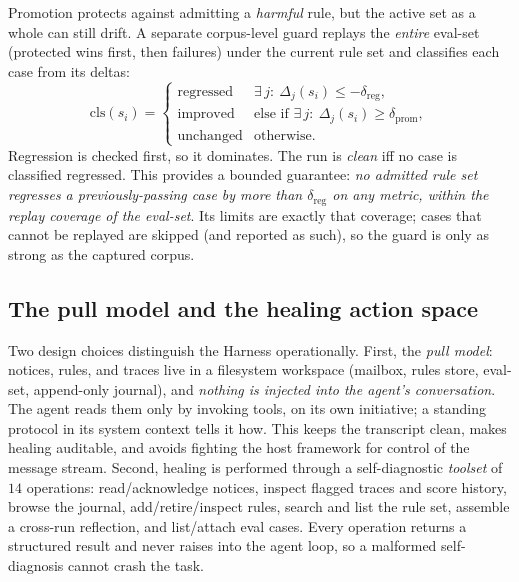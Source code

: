 \documentclass[letterpaper]{article} %
\newcommand{\dpromote}{\delta_{\mathrm{prom}}}
\newcommand{\dregress}{\delta_{\mathrm{reg}}}
\begin{document}
Promotion protects against admitting a \emph{harmful} rule, but the active set as a whole can
still drift. A separate corpus-level guard replays the \emph{entire} eval-set (protected wins
first, then failures) under the current rule set and classifies each case from its deltas:
\begin{equation}
  \mathrm{cls}(s_i) =
  \begin{cases}
    \text{regressed} & \exists\, j:\ \Delta_j(s_i) \le -\dregress,\\[2pt]
    \text{improved}  & \text{else if } \exists\, j:\ \Delta_j(s_i) \ge \dpromote,\\[2pt]
    \text{unchanged} & \text{otherwise.}
  \end{cases}
  \label{eq:regcls}
\end{equation}
Regression is checked first, so it dominates. The run is \emph{clean} iff no case is classified
regressed. This provides a bounded guarantee: \emph{no admitted rule set regresses a
previously-passing case by more than $\dregress$ on any metric, within the replay coverage of
the eval-set}. Its limits are exactly that coverage; cases that cannot be replayed are
skipped (and reported as such), so the guard is only as strong as the captured corpus.

\subsection{The pull model and the healing action space}
\label{sec:actionspace}

Two design choices distinguish the Harness operationally. First, the \emph{pull model}:
notices, rules, and traces live in a filesystem workspace (mailbox, rules store, eval-set,
append-only journal), and \emph{nothing is injected into the agent's conversation}. The agent
reads them only by invoking tools, on its own initiative; a standing protocol in its system
context tells it how. This keeps the transcript clean, makes healing auditable, and avoids
fighting the host framework for control of the message stream. Second, healing is performed
through a self-diagnostic \emph{toolset} of $14$ operations: read/acknowledge notices, inspect
flagged traces and score history, browse the journal, add/retire/inspect rules, search and list
the rule set, assemble a cross-run reflection, and list/attach eval cases. Every operation
returns a structured result and never raises into the agent loop, so a malformed self-diagnosis
cannot crash the task.
\end{document}
